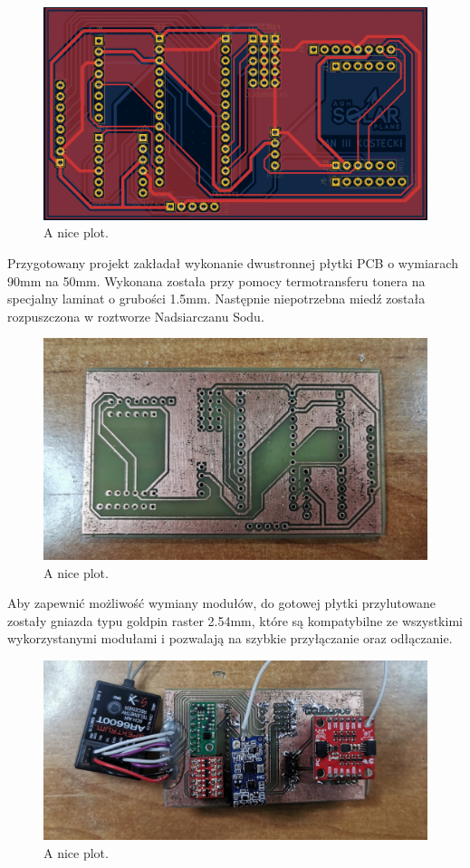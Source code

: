 \documentclass[12pt, a4paper]{article}
\begin{document}
 \begin{figure}[ht]
    \centering
    \includegraphics[width=1\textwidth]{plytkastara}
    \caption{A nice plot.}
\end{figure}
Przygotowany projekt zakładał wykonanie dwustronnej płytki PCB o wymiarach 90mm na 50mm. Wykonana została przy pomocy termotransferu tonera na specjalny laminat o grubości 1.5mm. Następnie niepotrzebna miedź została rozpuszczona w roztworze Nadsiarczanu Sodu. 
  \begin{figure}[ht]
    \centering
    \includegraphics[width=1\textwidth]{pcb}
    \caption{A nice plot.}
\end{figure}
Aby zapewnić możliwość wymiany modułów, do gotowej płytki przylutowane zostały gniazda typu goldpin raster 2.54mm, które są kompatybilne ze wszystkimi wykorzystanymi modułami i pozwalają na szybkie przyłączanie oraz odłączanie. 
   \begin{figure}[ht]
    \centering
    \includegraphics[width=1\textwidth]{kontorolerstary}
    \caption{A nice plot.}
\end{figure}
\end{document}
